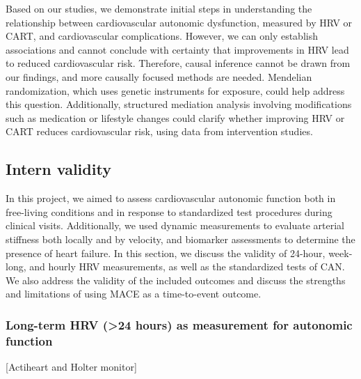 \documentclass[
  a4paper,
  headsepline=true,
  open=any]{scrbook}
\begin{document}
Based on our studies, we demonstrate initial steps in understanding the
relationship between cardiovascular autonomic dysfunction, measured by
HRV or CART, and cardiovascular complications. However, we can only
establish associations and cannot conclude with certainty that
improvements in HRV lead to reduced cardiovascular risk. Therefore,
causal inference cannot be drawn from our findings, and more causally
focused methods are needed. Mendelian randomization, which uses genetic
instruments for exposure, could help address this question.
Additionally, structured mediation analysis involving modifications such
as medication or lifestyle changes could clarify whether improving HRV
or CART reduces cardiovascular risk, using data from intervention
studies.

\hypertarget{intern-validity}{%
\subsection{Intern validity}\label{intern-validity}}

In this project, we aimed to assess cardiovascular autonomic function
both in free-living conditions and in response to standardized test
procedures during clinical visits. Additionally, we used dynamic
measurements to evaluate arterial stiffness both locally and by
velocity, and biomarker assessments to determine the presence of heart
failure. In this section, we discuss the validity of 24-hour, week-long,
and hourly HRV measurements, as well as the standardized tests of CAN.
We also address the validity of the included outcomes and discuss the
strengths and limitations of using MACE as a time-to-event outcome.

\hypertarget{long-term-hrv-24-hours-as-measurement-for-autonomic-function}{%
\subsubsection{Long-term HRV (\textgreater24 hours) as measurement for
autonomic
function}\label{long-term-hrv-24-hours-as-measurement-for-autonomic-function}}

{[}Actiheart and Holter monitor{]}
\end{document}

